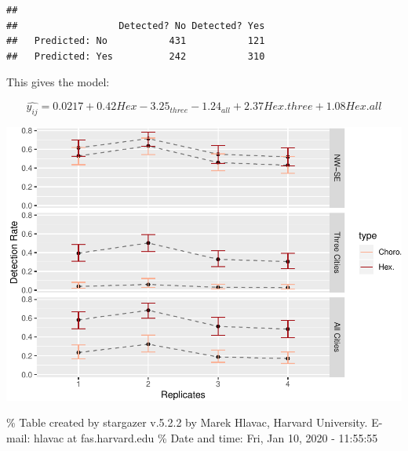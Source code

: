 \documentclass[conference,final,]{IEEEtran}
\makeatletter
\def\maxwidth{\ifdim\Gin@nat@width>\linewidth\linewidth
\else\Gin@nat@width\fi}
\let\Oldincludegraphics\includegraphics
\renewcommand{\includegraphics}[1]{\Oldincludegraphics[width=\maxwidth]{#1}}
\makeatother
\begin{document}
\begin{verbatim}
##                 
##                  Detected? No Detected? Yes
##   Predicted: No           431           121
##   Predicted: Yes          242           310
\end{verbatim}

This gives the model:

\[\widehat{y_{ij}} = 0.0217 + 0.42Hex -3.25_{three} -1.24_{all} + 2.37{Hex.three} + 1.08{Hex.all} \]

\includegraphics{paper_files/figure-latex/glm2-1.pdf}

\% Table created by stargazer v.5.2.2 by Marek Hlavac, Harvard
University. E-mail: hlavac at fas.harvard.edu \% Date and time: Fri, Jan
10, 2020 - 11:55:55
\end{document}
